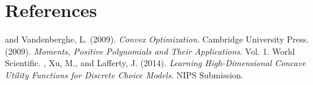 \documentclass[11pt]{article}
\begin{document}
\clearpage
\section*{References}
\beginrefs
{} and {\sc Vandenberghe, L.} (2009).
{\it Convex Optimization}.
Cambridge University Press.
 (2009).
{\it Moments, Positive Polynomials and Their Applications}. Vol. 1. 
World Scientific.
, {\sc Xu, M.}, and {\sc Lafferty, J.} (2014).
{\it Learning High-Dimensional Concave Utility Functions for Discrete Choice Models}.
NIPS Submission.
\endrefs



\end{document}
